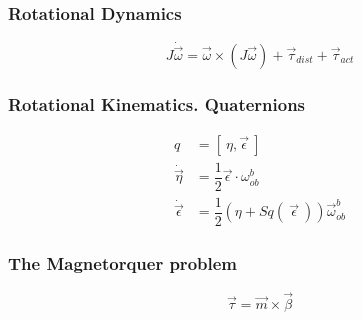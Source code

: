 \documentclass{beamer}
\begin{document}
\begin{frame}
\frametitle{Rotational Dynamics}
\begin{equation*}
J\dot{\vec{\omega}} =
 \vec{\omega}\times\left(J\vec{\omega}\right) + 
 \vec{\tau}_{dist} + \vec{\tau}_{act}
\end{equation*}
\end{frame}

\begin{frame}
\frametitle{Rotational Kinematics. Quaternions}
\begin{align*}
q &= \left[\
\eta, \vec{\epsilon}\ \right]\\
\dot{\vec{\eta}} &= \dfrac{1}{2} \vec{\epsilon} \cdot \omega^b_{ob}\\
\dot{\vec{\epsilon}} &= \dfrac{1}{2}\left(\eta +Sq(\ \vec{\epsilon}\ ) \right)\vec{\omega}^b_{ob}
\end{align*}
\end{frame}

\begin{frame}
\frametitle{The Magnetorquer problem}
\begin{equation}
\vec{\tau} = \vec{m}\times\vec{\beta}
\end{equation}
\end{frame}
\end{document}

